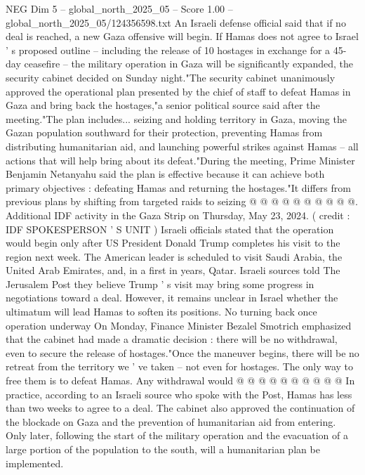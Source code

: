 \begin{textsample}{NEG Dim 5 – global\_north\_2025\_05 – Score 1.00 – global\_north\_2025\_05/124356598.txt}  \label{ex:f5_neg_372}
An Israeli defense official said that if no deal is reached, a new Gaza offensive will begin.
If Hamas does not agree to Israel ' s proposed outline -- including the release of 10 hostages in exchange for a 45-day ceasefire -- the military operation in Gaza will be significantly expanded, the security cabinet decided on Sunday night."The security cabinet unanimously approved the operational plan presented by the chief of staff to defeat Hamas in Gaza and bring back the hostages,"a senior political source said after the meeting."The plan includes... seizing and holding territory in Gaza, moving the Gazan population southward for their protection, preventing Hamas from distributing humanitarian aid, and launching powerful strikes against Hamas -- all actions that will help bring about its defeat."During the meeting, Prime Minister Benjamin Netanyahu said the plan is effective because it can achieve both primary objectives : defeating Hamas and returning the hostages."It differs from previous plans by shifting from targeted raids to seizing @ @ @ @ @ @ @ @ @ @.
Additional IDF activity in the Gaza Strip on Thursday, May 23, 2024. ( credit : IDF SPOKESPERSON ' S UNIT ) Israeli officials stated that the operation would begin only after US President Donald Trump completes his visit to the region next week.
The American leader is scheduled to visit Saudi Arabia, the United Arab Emirates, and, in a first in years, Qatar.
Israeli sources told The Jerusalem Post they believe Trump ' s visit may bring some progress in negotiations toward a deal.
However, it remains unclear in Israel whether the ultimatum will lead Hamas to soften its positions.
No turning back once operation underway On Monday, Finance Minister Bezalel Smotrich emphasized that the cabinet had made a dramatic decision : there will be no withdrawal, even to secure the release of hostages."Once the maneuver begins, there will be no retreat from the territory we ' ve taken -- not even for hostages.
The only way to free them is to defeat Hamas.
Any withdrawal would @ @ @ @ @ @ @ @ @ @ In practice, according to an Israeli source who spoke with the Post, Hamas has less than two weeks to agree to a deal.
The cabinet also approved the continuation of the blockade on Gaza and the prevention of humanitarian aid from entering.
Only later, following the start of the military operation and the evacuation of a large portion of the population to the south, will a humanitarian plan be implemented.

\end{textsample}
